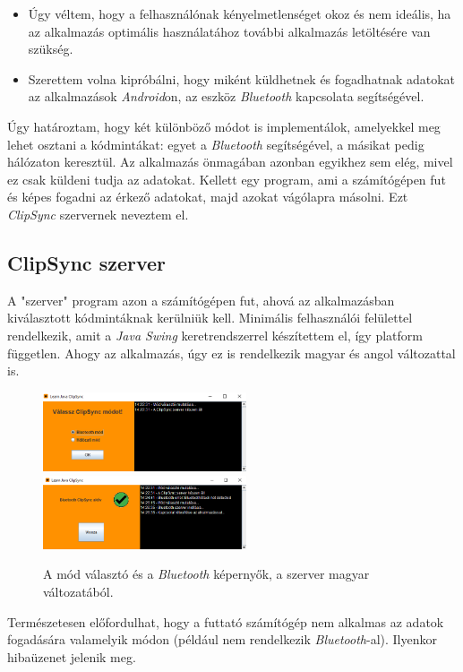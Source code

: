 \documentclass[12pt,a4paper]{article}
\begin{document}
	\begin{itemize}
		\item Úgy véltem, hogy a felhasználónak kényelmetlenséget okoz és nem ideális, ha az alkalmazás optimális használatához további alkalmazás letöltésére van szükség.
		\item Szerettem volna kipróbálni, hogy miként küldhetnek és fogadhatnak adatokat az alkalmazások \textit{Android}on, az eszköz \textit{Bluetooth} kapcsolata segítségével.
	\end{itemize} 
	
	Úgy határoztam, hogy két különböző módot is implementálok, amelyekkel meg lehet osztani a kódmintákat: egyet a \textit{Bluetooth} segítségével, a másikat pedig hálózaton keresztül. Az alkalmazás önmagában azonban egyikhez sem elég, mivel ez csak küldeni tudja az adatokat. Kellett egy program, ami a számítógépen fut és képes fogadni az érkező adatokat, majd azokat vágólapra másolni. Ezt \textit{ClipSync} szervernek neveztem el.
	
	\subsection{ClipSync szerver}
	
	A "szerver" program azon a számítógépen fut, ahová az alkalmazásban kiválasztott kódmintáknak kerülniük kell. Minimális felhasználói felülettel rendelkezik, amit a \textit{Java Swing} keretrendszerrel készítettem el, így platform független. Ahogy az alkalmazás, úgy ez is rendelkezik magyar és angol változattal is.
	
	\begin{figure}[h!]
		\includegraphics[width=6cm]{clipsync_server_select}\hfill
		\includegraphics[width=6cm]{clipsync_server_bluetooth}
		\caption{A mód választó és a \textit{Bluetooth} képernyők, a szerver magyar változatából.}
	\end{figure}

	Természetesen előfordulhat, hogy a futtató számítógép nem alkalmas az adatok fogadására valamelyik módon (például nem rendelkezik \textit{Bluetooth}-al). Ilyenkor hibaüzenet jelenik meg.
	
\end{document}
